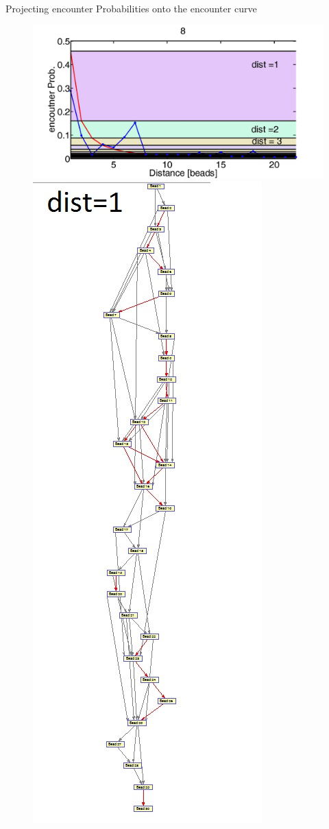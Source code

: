 \documentclass[8pt]{beamer}
\begin{document}
\begin{frame}{Projecting encounter Probabilities onto the encounter curve}
\begin{figure}[H]
\includegraphics[scale=0.07]{encounterProbProjectedBead8}
\includegraphics[scale=0.15]{connectivityGraph30BeadsDistance1}

\end{figure}
\end{frame}
\end{document}
